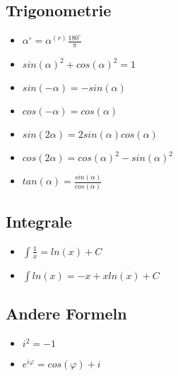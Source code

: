 \subsection{Trigonometrie}
\begin{itemize}
	\item $\alpha^\circ = \alpha^{(r)} \frac{180^\circ}{\pi}$
	\item $sin(\alpha)^2 + cos(\alpha)^2 = 1$
	\item $sin(-\alpha) = - sin(\alpha)$
	\item $cos(-\alpha) = cos(\alpha)$
	\item $sin(2\alpha) = 2 sin(\alpha) cos(\alpha)$
	\item $cos(2\alpha) = cos(\alpha)^2 - sin(\alpha)^2$
	\item $tan(\alpha) = \frac{sin(\alpha)}{cos(\alpha)}$
\end{itemize}

\subsection{Integrale}
\begin{itemize}
    \item $\int \frac{1}{x} = ln(x) + C$
    \item $\int ln(x) = -x + x ln(x) + C$
\end{itemize}

\subsection{Andere Formeln}
\begin{itemize}
    \item $i^2 = -1$
    \item $e^{i\varphi} = cos(\varphi) + i$
\end{itemize}
